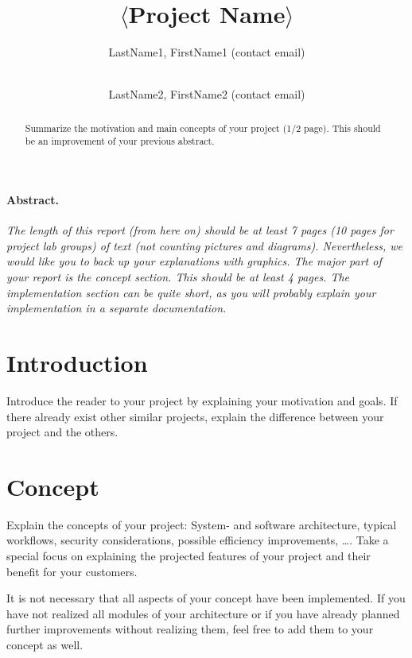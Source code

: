 \documentclass{scrarticle}
\begin{document}
\title{$\langle$Project Name$\rangle$} %
\author{%
	LastName1, FirstName1 (contact email) 
	\and \\
	LastName2, FirstName2 (contact email)
}


\clearpage

\paragraph{Abstract.}
\begin{abstract}
	Summarize the motivation and main concepts of your project (1/2 page). This should be an improvement of your previous abstract.
\end{abstract}

\newpage

\textit{The length of this report (from here on) should be at least 7 pages (10 pages for project lab groups) of text (not counting pictures and diagrams). Nevertheless, we would like you to back up your explanations with graphics. The major part of your report is the concept section. This should be at least 4 pages. The implementation section can be quite short, as you will probably explain your implementation in a separate documentation.}

\section{Introduction}
Introduce the reader to your project by explaining your motivation and goals. If there already exist other similar projects, explain the difference between your project and the others.

\section{Concept}
Explain the concepts of your project: System- and software architecture, typical workflows, security considerations, possible efficiency improvements, …. Take a special focus on explaining the projected features of your project and their benefit for your customers.

It is not necessary that all aspects of your concept have been implemented. If you have not realized all modules of your architecture or if you have already planned further improvements without realizing them, feel free to add them to your concept as well.
\end{document}
